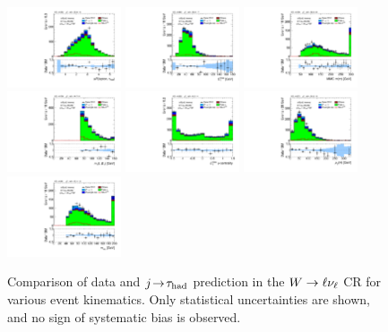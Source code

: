\begin{figure}[!htpb]
  \includegraphics[width=0.30\textwidth]{figures/analysis/vbf-WlvCR/taulep-dR}
  \includegraphics[width=0.30\textwidth]{figures/analysis/vbf-WlvCR/met-pt-hi}
  \includegraphics[width=0.30\textwidth]{figures/analysis/vbf-WlvCR/mMMC}
  \includegraphics[width=0.30\textwidth]{figures/analysis/vbf-WlvCR/mT-hi}
  \includegraphics[width=0.30\textwidth]{figures/analysis/vbf-WlvCR/met-phi-centrality}
  \includegraphics[width=0.30\textwidth]{figures/analysis/vbf-WlvCR/H-pt-hi}
  \includegraphics[width=0.30\textwidth]{figures/analysis/vbf-WlvCR/mvis}
  \caption{Comparison of data and $j\!\rightarrow\!\tau_\text{had}$ prediction in the $W \rightarrow \ell\nu_\ell$ CR for various event kinematics. Only statistical uncertainties are shown, and no sign of systematic bias is observed.}
  \label{fig:backgrounds-WlvCR-taus}
\end{figure}

